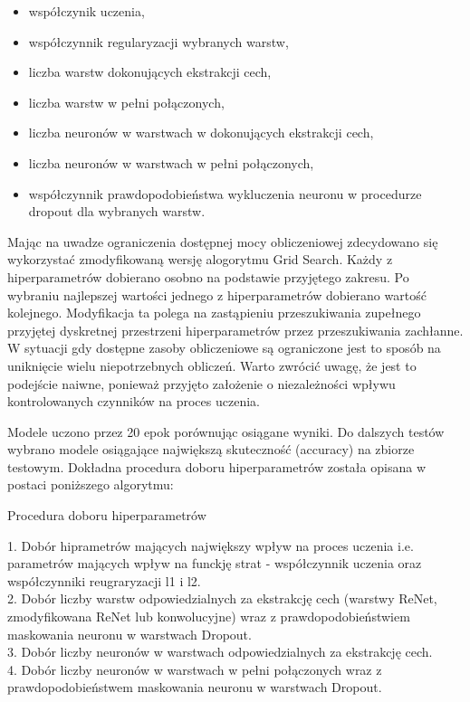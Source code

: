 \documentclass[oneside, mag]{mgr}
\begin{document}
\begin{itemize}
\item współczynik uczenia,
\item współczynnik regularyzacji wybranych warstw,
\item liczba warstw dokonujących ekstrakcji cech,
\item liczba warstw w pełni połączonych,
\item liczba neuronów w warstwach w dokonujących ekstrakcji cech,
\item liczba neuronów w warstwach w pełni połączonych,
\item współczynnik prawdopodobieństwa wykluczenia neuronu w procedurze dropout dla wybranych warstw.
\end{itemize}

Mając na uwadze ograniczenia dostępnej mocy obliczeniowej zdecydowano się wykorzystać zmodyfikowaną wersję alogorytmu Grid Search. Każdy z hiperparametrów dobierano osobno na podstawie przyjętego zakresu. Po wybraniu najlepszej wartości jednego z hiperparametrów dobierano wartość kolejnego. Modyfikacja ta polega na zastąpieniu przeszukiwania zupełnego przyjętej dyskretnej przestrzeni hiperparametrów przez przeszukiwania zachłanne. W sytuacji gdy dostępne zasoby obliczeniowe są ograniczone jest to sposób na uniknięcie wielu niepotrzebnych obliczeń. Warto zwrócić uwagę, że jest to podejście naiwne, ponieważ przyjęto założenie o niezależności wpływu kontrolowanych czynników na proces uczenia.

Modele uczono przez 20 epok porównując osiągane wyniki. Do dalszych testów wybrano modele osiągające największą skuteczność (accuracy) na zbiorze testowym. Dokładna procedura doboru hiperparametrów została opisana w postaci poniższego algorytmu:

\begin{algorithm}[H]
\SetAlgoLined
\caption{Procedura doboru hiperparametrów}
1. Dobór hiprametrów mających największy wpływ na proces uczenia i.e. parametrów mających wpływ na funckję strat - współczynnik uczenia oraz współczynniki reugraryzacji l1 i l2.\\
2. Dobór liczby warstw odpowiedzialnych za ekstrakcję cech (warstwy ReNet, zmodyfikowana ReNet lub konwolucyjne) wraz z prawdopodobieństwiem maskowania neuronu w warstwach Dropout.\\
3. Dobór liczby neuronów w warstwach odpowiedzialnych za ekstrakcję cech.\\
4. Dobór liczby neuronów w warstwach w pełni połączonych wraz z prawdopodobieństwem maskowania neuronu w warstwach Dropout.\\
\end{algorithm}
\end{document}
